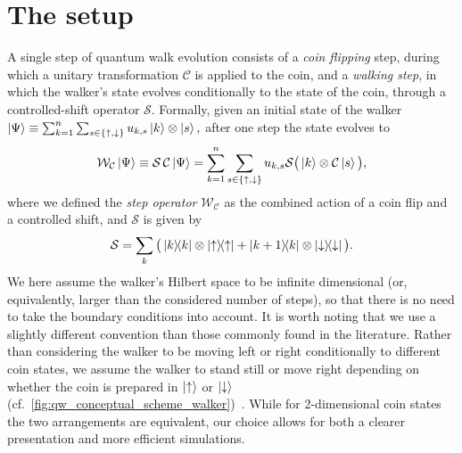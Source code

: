 \section{The setup}
A single step of quantum walk evolution consists of a \emph{coin flipping} step, during which a unitary { transformation} $\mathcal C$ is applied to the coin, and a \emph{walking step}, in which the walker's state evolves conditionally to the state of the coin, through a controlled-shift operator $\mathcal S$.
Formally, given an initial state of the walker
$
	\ket\Psi \equiv \sum_{k=1}^n \sum_{s\in\{\uparrow,\downarrow\}}
	u_{k,s} \ket{k} \otimes \ket{s},
$
after one step the state evolves to
\begin{equation}
	\mathcal W_{\mathcal C} \ket\Psi \equiv
	\mathcal S \,\mathcal C \ket\Psi
	= \sum_{k=1}^n \sum_{s\in\{\uparrow,\downarrow\}}
	u_{k,s}
	\mathcal S \big( \ket{k} \otimes \mathcal C \ket{s} \big),
	\label{eq:step_operator_definition}
\end{equation}
where we defined the \emph{step operator} $\mathcal W_{\mathcal C}$ as the combined action of a coin flip and a controlled shift, and $\mathcal S$ is given by
\begin{equation}
	\mathcal S =
	\sum_k \big(
		\ketbra{k}{k} \otimes \ketbra{\uparrow}{\uparrow}
		+
		\ketbra{k + 1}{k} \otimes \ketbra{\downarrow}{\downarrow}
	\big).
	\label{eq:controlled_shift_operator}
\end{equation}
We here assume the walker's Hilbert space to be infinite dimensional (or, equivalently, larger than the considered number of steps), so that there is no need to take the boundary conditions into account.
It is worth noting that we use a slightly different convention than those commonly found in the literature. Rather than considering the walker to be moving left or right conditionally to different coin states, we assume the walker to stand still or move right depending on whether the coin is prepared in $\ket{\uparrow}$ or $\ket{\downarrow}$ (cf.~\cref{fig:qw_conceptual_scheme_walker})~\cite{hoyer2009faster, montero2013unidirectional,montero2015quantum}.
While for 2-dimensional coin states the two arrangements are equivalent, our choice allows for both a clearer presentation and more efficient simulations.


